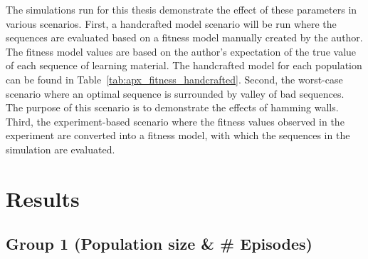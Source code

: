 \noindent
The simulations run for this thesis demonstrate the effect of these parameters
in various scenarios. First, a handcrafted model scenario will be run where the
sequences are evaluated based on a fitness model manually created by the
author. The fitness model values are based on the author's expectation of the
true value of each sequence of learning material. The handcrafted model for
each population can be found in
Table~\ref{tab:apx_fitness_handcrafted}. Second, the worst-case scenario where
an optimal sequence is surrounded by valley of bad sequences. The purpose of
this scenario is to demonstrate the effects of hamming walls. Third, the
experiment-based scenario where the fitness values observed in the experiment
are converted into a fitness model, with which the sequences in the simulation
are evaluated.
\section{Results}
\label{sec:simulations_results}
\subsection{Group 1 (Population size \& \# Episodes)}
